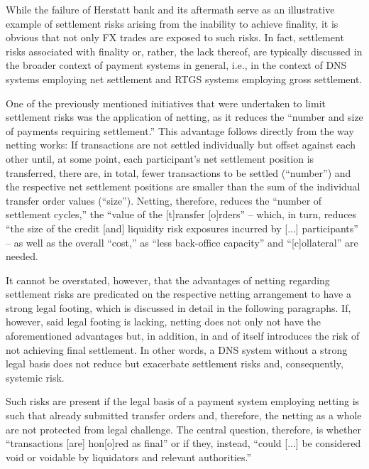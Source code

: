While the failure of Herstatt bank and its aftermath serve as an illustrative example of settlement risks arising from the inability to achieve finality, it is obvious that not only FX trades are exposed to such risks.
In fact, settlement risks associated with finality or, rather, the lack thereof, are typically discussed in the broader context of payment systems in general, i.e., in the context of DNS systems employing net settlement and RTGS systems employing gross settlement.

One of the previously mentioned initiatives that were undertaken to limit settlement risks was the application of netting, as it reduces the ``number and size of payments requiring settlement.'' \autocite[59]{galati2002}
This advantage follows directly from the way netting works:
If transactions are not settled individually but offset against each other until, at some point, each participant's net settlement position is transferred, there are, in total, fewer transactions to be settled (``number'') and the respective net settlement positions are smaller than the sum of the individual transfer order values (``size'').
Netting, therefore, reduces the ``number of settlement cycles,'' the ``value of the [t]ransfer [o]rders'' -- which, in turn, reduces ``the size of the credit [and] liquidity risk exposures incurred by [...] participants'' -- as well as the overall ``cost,'' as ``less back-office capacity'' and ``[c]ollateral'' are needed. \autocite[40]{vereecken2003}

It cannot be overstated, however, that the advantages of netting regarding settlement risks are predicated on the respective netting arrangement to have a strong legal footing, which is discussed in detail in the following paragraphs.
If, however, said legal footing is lacking, netting does not only not have the aforementioned advantages but, in addition, in and of itself introduces the risk of not achieving final settlement.
In other words, a DNS system without a strong legal basis does not reduce but exacerbate settlement risks and, consequently, systemic risk.

Such risks are present if the legal basis of a payment system employing netting is such that already submitted transfer orders and, therefore, the netting as a whole are not protected from legal challenge.
The central question, therefore, is whether ``transactions [are] hon[o]red as final'' or if they, instead, ``could [...] be considered void or voidable by liquidators and relevant authorities.'' \autocite[16]{bis2016cpmiglossary}

